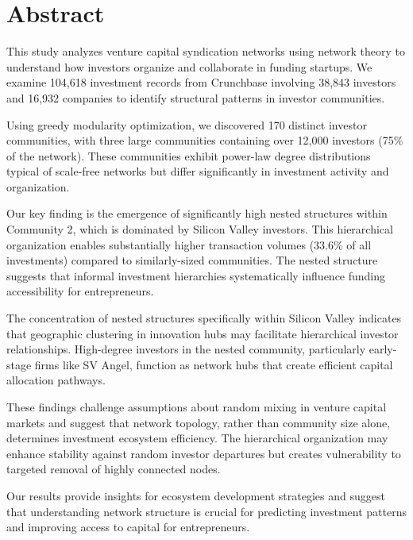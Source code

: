 \section*{Abstract}

This study analyzes venture capital syndication networks using network theory to understand how investors organize and collaborate in funding startups. We examine 104,618 investment records from Crunchbase involving 38,843 investors and 16,932 companies to identify structural patterns in investor communities.

Using greedy modularity optimization, we discovered 170 distinct investor communities, with three large communities containing over 12,000 investors (75\% of the network). These communities exhibit power-law degree distributions typical of scale-free networks but differ significantly in investment activity and organization.

Our key finding is the emergence of significantly high nested structures within Community 2, which is dominated by Silicon Valley investors. This hierarchical organization enables substantially higher transaction volumes (33.6\% of all investments) compared to similarly-sized communities. The nested structure suggests that informal investment hierarchies systematically influence funding accessibility for entrepreneurs.


The concentration of nested structures specifically within Silicon Valley indicates that geographic clustering in innovation hubs may facilitate hierarchical investor relationships. High-degree investors in the nested community, particularly early-stage firms like SV Angel, function as network hubs that create efficient capital allocation pathways.

These findings challenge assumptions about random mixing in venture capital markets and suggest that network topology, rather than community size alone, determines investment ecosystem efficiency. The hierarchical organization may enhance stability against random investor departures but creates vulnerability to targeted removal of highly connected nodes.

Our results provide insights for ecosystem development strategies and suggest that understanding network structure is crucial for predicting investment patterns and improving access to capital for entrepreneurs.

\pagebreak